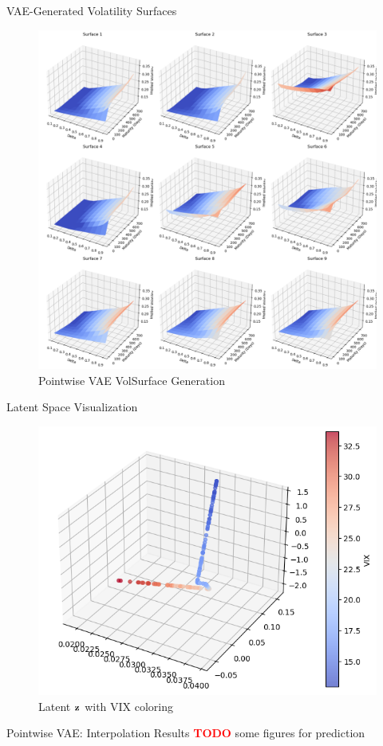 \documentclass{beamer}
\newcommand\todo{\textcolor{red}{\textbf{TODO}}}
\begin{document}
\begin{frame}{VAE-Generated Volatility Surfaces}
\begin{figure}
    \centering
    \includegraphics[width=0.65\linewidth]{docs/slides/img/vae_pw_ii_plot_from_5.png}
    \caption{Pointwise VAE VolSurface Generation}
    \label{fig:enter-label}
\end{figure}
\end{frame}

\begin{frame}{Latent Space Visualization}
\begin{figure}
    \centering
    \includegraphics[width=0.8\linewidth]{docs/slides/img/latent_vix.png}
    \caption{Latent $\bf{z}$ with VIX coloring}
    \label{fig:enter-label}
\end{figure}
\end{frame}

\begin{frame}{Pointwise VAE: Interpolation Results}
\todo
some figures for prediction

\end{frame}
\end{document}
